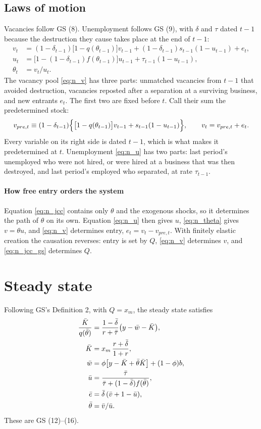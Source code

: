 \documentclass[authoryear, review, 12pt]{elsarticle}
\begin{document}
\subsection{Laws of motion}

Vacancies follow GS (8). Unemployment follows GS (9), with $\delta$ and $\tau$ dated $t-1$
because the destruction they cause takes place at the end of $t-1$:
\begin{align}
	v_t&=(1-\delta_{t-1})\bigl[1-q(\theta_{t-1})\bigr]v_{t-1}+(1-\delta_{t-1})s_{t-1}(1-u_{t-1})+e_t,
	\label{eq:n_v}\\
	u_t&=\bigl[1-(1-\delta_{t-1})f(\theta_{t-1})\bigr]u_{t-1}+\tau_{t-1}(1-u_{t-1}),
	\label{eq:n_u}\\
	\theta_t&=v_t/u_t. \label{eq:n_theta}
\end{align}
The vacancy pool \eqref{eq:n_v} has three parts: unmatched vacancies from $t-1$ that avoided
destruction, vacancies reposted after a separation at a surviving business, and new
entrants $e_t$. The first two are fixed before $t$. Call their sum the predetermined stock:
\[
	v_{pre,t}\equiv(1-\delta_{t-1})\Bigl\{\bigl[1-q(\theta_{t-1})\bigr]v_{t-1}+s_{t-1}(1-u_{t-1})\Bigr\},
	\qquad v_t=v_{pre,t}+e_t .
\]
Every variable on its right side is dated $t-1$, which is what makes it predetermined at
$t$. Unemployment \eqref{eq:n_u} has two parts: last period's unemployed who were not
hired, or were hired at a business that was then destroyed, and last period's employed who
separated, at rate $\tau_{t-1}$.

\paragraph{How free entry orders the system}
Equation \eqref{eq:n_jcc} contains only $\theta$ and the exogenous shocks, so it
determines the path of $\theta$ on its own. Equation \eqref{eq:n_u} then gives $u$,
\eqref{eq:n_theta} gives $v=\theta u$, and \eqref{eq:n_v} determines entry,
$e_t=v_t-v_{pre,t}$. With finitely elastic creation the causation reverses: entry is set by
$Q$, \eqref{eq:n_v} determines $v$, and \eqref{eq:n_jcc_gs} determines $Q$.

\section{Steady state}

Following GS's Definition 2, with $Q=x_m$, the steady state satisfies
\begin{align}
	\frac{\bar K}{q(\bar\theta)}&=\frac{1-\bar\delta}{r+\bar\tau}\bigl(y-\bar w-\bar K\bigr),
	\label{eq:ss_jcc}\\
	\bar K&=x_m\,\frac{r+\bar\delta}{1+r},\label{eq:ss_K}\\
	\bar w&=\phi\bigl[y-\bar K+\bar\theta\bar K\bigr]+(1-\phi)b,\label{eq:ss_w}\\
	\bar u&=\frac{\bar\tau}{\bar\tau+(1-\bar\delta)f(\bar\theta)},\label{eq:ss_u}\\
	\bar e&=\bar\delta\,(\bar v+1-\bar u),\label{eq:ss_e}\\
	\bar\theta&=\bar v/\bar u .\notag
\end{align}
These are GS (12)--(16).
\end{document}
